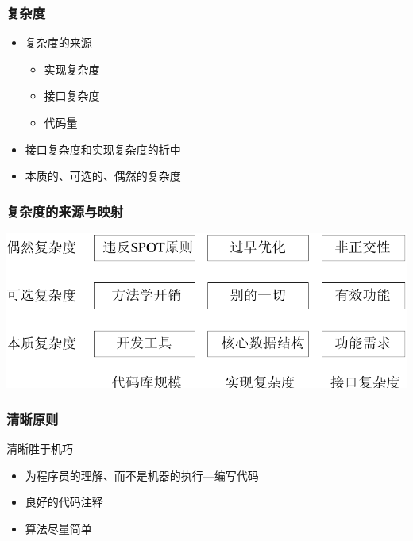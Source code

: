 \documentclass[compress]{beamer}
\begin{document}
\begin{frame}
  \frametitle{复杂度}
  \begin{itemize}
	\item 复杂度的来源
	  \begin{itemize}
		\item 实现复杂度
		\item 接口复杂度
		\item 代码量
	  \end{itemize}
	\item 接口复杂度和实现复杂度的折中
	\item 本质的、可选的、偶然的复杂度
  \end{itemize}
  
\end{frame}

\begin{frame}
  \frametitle{复杂度的来源与映射}
  
  \centering\includegraphics[width=\hsize]{complexity.pdf}
  
\end{frame}


\begin{frame}
\frametitle{清晰原则}

\begin{block}{清晰胜于机巧}
\begin{itemize}
\item 为程序员的理解、而不是机器的执行---编写代码 
\item 良好的代码注释
\item 算法尽量简单
\end{itemize}
\end{block}

\end{frame}
\end{document}
